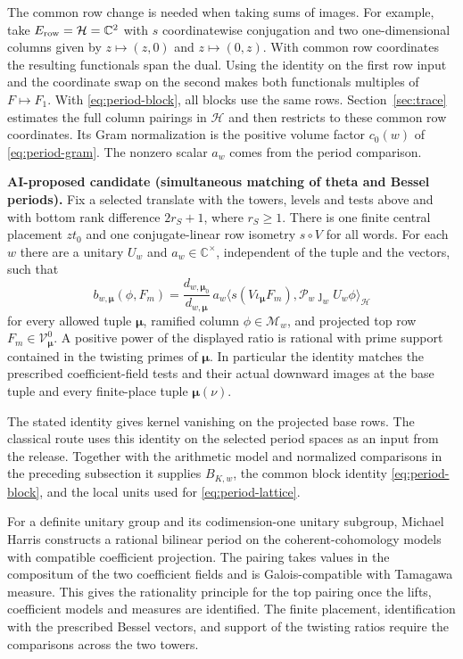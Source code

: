 The common row change is needed when taking sums of images.
For example, take \(E_{\rm row}=\mathcal H=\mathbb C^2\) with
\(s\) coordinatewise conjugation and two one-dimensional columns
given by \(z\mapsto(z,0)\) and \(z\mapsto(0,z)\). With common row
coordinates the resulting functionals span the dual. Using the
identity on the first row input and the coordinate swap on the
second makes both functionals multiples of \(F\mapsto F_1\).
With \eqref{eq:period-block}, all blocks use the same rows.
Section~\ref{sec:trace} estimates the full column pairings in
\(\mathcal H\) and then restricts to these common row coordinates.
Its Gram normalization is the positive volume factor \(c_0(w)\)
of \eqref{eq:period-gram}. The nonzero scalar \(a_w\) comes from the
period comparison.

\noindent\leavevmode{}%
\textbf{AI-proposed candidate (simultaneous matching of theta and Bessel periods).}
Fix a selected translate with the towers, levels and tests above
and with bottom rank difference \(2r_S+1\), where \(r_S\ge1\).
There is one finite central placement \(zt_0\) and one
conjugate-linear row isometry \(s\circ V\) for all words. For each \(w\)
there are a unitary \(U_w\) and \(a_w\in\mathbb C^\times\), independent
of the tuple and the vectors, such that
\[
 b_{w,\boldsymbol\mu}(\phi,F_m)
  = \frac{d_{w,\boldsymbol\mu_0}}{d_{w,\boldsymbol\mu}}\,
       a_w\big\langle s(V\iota_{\boldsymbol\mu}F_m),
                    \mathcal P_w\jmath_w U_w\phi\big\rangle_{\mathcal H}
\]
for every allowed tuple \(\boldsymbol\mu\), ramified column
\(\phi\in\mathcal M_w\), and projected top row
\(F_m\in\mathcal V^0_{\boldsymbol\mu}\). A positive power of the displayed
ratio is rational with prime support contained in the twisting primes
of \(\boldsymbol\mu\). In particular the identity matches the
prescribed coefficient-field tests and their actual downward images
at the base tuple and every finite-place tuple \(\boldsymbol\mu(\nu)\).

The stated identity gives kernel vanishing on the projected base
rows. The classical route uses this identity on the selected
period spaces as an input from the release. Together with the
arithmetic model and normalized comparisons
in the preceding subsection it supplies \(B_{K,w}\), the common block
identity \eqref{eq:period-block}, and the local units used for
\eqref{eq:period-lattice}.

For a definite unitary group and its codimension-one unitary
subgroup, Michael Harris constructs a rational bilinear period on
the coherent-cohomology models with compatible coefficient
projection. The pairing takes values in the compositum of the
two coefficient fields and is Galois-compatible with Tamagawa
measure. \cite[\S2.5, Lemma~2.5.4]{p2harris-adjoint}
This gives the rationality principle for the top pairing once
the lifts, coefficient models and measures are identified. The
finite placement, identification with the prescribed Bessel
vectors, and support of the twisting ratios require the
comparisons across the two towers.

